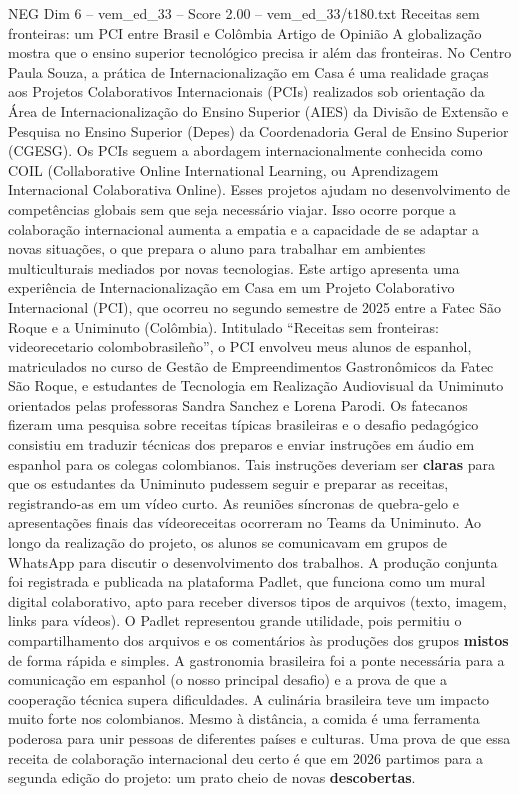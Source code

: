 \begin{textsample}{NEG Dim 6 – vem\_ed\_33 – Score 2.00 – vem\_ed\_33/t180.txt}  \label{ex:f6_neg_096}
Receitas sem fronteiras: um PCI entre Brasil e Colômbia Artigo de Opinião A globalização mostra que o ensino superior tecnológico precisa ir além das fronteiras.
No Centro Paula Souza, a prática de Internacionalização em Casa é uma realidade graças aos Projetos Colaborativos Internacionais (PCIs) realizados sob orientação da Área de Internacionalização do Ensino Superior (AIES) da Divisão de Extensão e Pesquisa no Ensino Superior (Depes) da Coordenadoria Geral de Ensino Superior (CGESG).
Os PCIs seguem a abordagem internacionalmente conhecida como COIL (Collaborative Online International Learning, ou Aprendizagem Internacional Colaborativa Online).
Esses projetos ajudam no desenvolvimento de competências globais sem que seja necessário viajar.
Isso ocorre porque a colaboração internacional aumenta a empatia e a capacidade de se adaptar a novas situações, o que prepara o aluno para trabalhar em ambientes multiculturais mediados por novas tecnologias.
Este artigo apresenta uma experiência de Internacionalização em Casa em um Projeto Colaborativo Internacional (PCI), que ocorreu no segundo semestre de 2025 entre a Fatec São Roque e a Uniminuto (Colômbia).
Intitulado “Receitas sem fronteiras: videorecetario colombobrasileño”, o PCI envolveu meus alunos de espanhol, matriculados no curso de Gestão de Empreendimentos Gastronômicos da Fatec São Roque, e estudantes de Tecnologia em Realização Audiovisual da Uniminuto orientados pelas professoras Sandra Sanchez e Lorena Parodi.
Os fatecanos fizeram uma pesquisa sobre receitas típicas brasileiras e o desafio pedagógico consistiu em traduzir técnicas dos preparos e enviar instruções em áudio em espanhol para os colegas colombianos.
Tais instruções deveriam ser \textbf{claras} para que os estudantes da Uniminuto pudessem seguir e preparar as receitas, registrando-as em um vídeo curto.
As reuniões síncronas de quebra-gelo e apresentações finais das vídeoreceitas ocorreram no Teams da Uniminuto.
Ao longo da realização do projeto, os alunos se comunicavam em grupos de WhatsApp para discutir o desenvolvimento dos trabalhos.
A produção conjunta foi registrada e publicada na plataforma Padlet, que funciona como um mural digital colaborativo, apto para receber diversos tipos de arquivos (texto, imagem, links para vídeos).
O Padlet representou grande utilidade, pois permitiu o compartilhamento dos arquivos e os comentários às produções dos grupos \textbf{mistos} de forma rápida e simples.
A gastronomia brasileira foi a ponte necessária para a comunicação em espanhol (o nosso principal desafio) e a prova de que a cooperação técnica supera dificuldades.
A culinária brasileira teve um impacto muito forte nos colombianos.
Mesmo à distância, a comida é uma ferramenta poderosa para unir pessoas de diferentes países e culturas.
Uma prova de que essa receita de colaboração internacional deu certo é que em 2026 partimos para a segunda edição do projeto: um prato cheio de novas \textbf{descobertas}.

\end{textsample}
